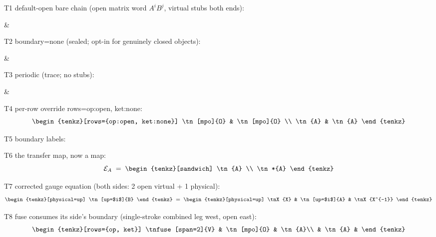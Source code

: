 \documentclass[varwidth=19cm, border=6pt]{standalone}
\begin{document}
T1 default-open bare chain (open matrix word $A^{i}B^{j}$, virtual stubs both ends):
\begin{tenkz}[physical=up]
   & 
\end{tenkz}

T2 boundary=none (sealed; opt-in for genuinely closed objects):
\begin{tenkz}[physical=up, boundary=none]
   & 
\end{tenkz}

T3 periodic (trace; no stubs):
\begin{tenkz}[periodic, physical=up]
   & 
\end{tenkz}

T4 per-row override rows={op:open, ket:none}:
\[
  \begin{tenkz}[rows={op:open, ket:none}]
    \tn[mpo]{O} & \tn[mpo]{O} \\
    \tn{A} & \tn{A}
  \end{tenkz}
\]

T5 boundary labels:
\begin{tenkz}[physical=up, west label=$\alpha$, east label=$\beta$]
\end{tenkz}

T6 the transfer map, now a map:
\[
  \mathcal{E}_A \;=\;
  \begin{tenkz}[sandwich]
    \tn{A} \\
    \tn*{A}
  \end{tenkz}
\]

T7 corrected gauge equation (both sides: 2 open virtual + 1 physical):
\[
  \begin{tenkz}[physical=up]
    \tn[up=$i$]{B}
  \end{tenkz}
  \;=\;
  \begin{tenkz}[physical=up]
    \tnX{X} & \tn[up=$i$]{A} & \tnX{X^{-1}}
  \end{tenkz}
\]

T8 fuse consumes its side's boundary (single-stroke combined leg west, open east):
\[
  \begin{tenkz}[rows={op, ket}]
    \tnfuse[span=2]{V} & \tn[mpo]{O} & \tn{A}\\
                       & \tn{A} &
  \end{tenkz}
\]
\end{document}
